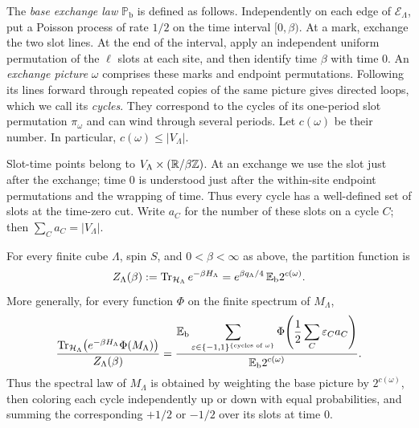 The \emph{base exchange law} $\mathbb P_{\mathrm b}$ is defined as
follows.  Independently on each edge of $\mathcal E_\Lambda$, put a
Poisson process of rate $1/2$ on the time interval $[0,\beta)$.
At a mark, exchange the two slot lines.  At the end of the interval,
apply an independent uniform permutation of the $\ell$ slots at each
site, and then identify time $\beta$ with time $0$.
An \emph{exchange picture} $\omega$ comprises these marks and endpoint
permutations.  Following its lines forward through repeated copies of
the same picture gives directed loops, which we call its \emph{cycles}.
They correspond to the cycles of its one-period slot permutation
$\pi_\omega$ and can wind through several periods.  Let
$c(\omega)$ be their number.  In particular,
$c(\omega)\le |V_\Lambda|$.

Slot-time points belong to
$V_\Lambda\times(\mathbb R/\beta\mathbb Z)$.  At an exchange we use the slot just
after the exchange; time $0$ is understood just after the within-site
endpoint permutations and the wrapping of time.  Thus every cycle has
a well-defined set of slots at the time-zero cut.  Write $a_C$ for the
number of these slots on a cycle $C$; then $\sum_C a_C=|V_\Lambda|$.

\begin{proposition}\label{prop:spin-loops}
For every finite cube $\Lambda$, spin $S$, and $0<\beta<\infty$ as
above, the partition function is
\begin{equation}\label{eq:loop-partition-function}
 Z_\Lambda(\beta):=\operatorname{Tr}_{\mathcal H_\Lambda}e^{-\beta H_\Lambda}
       =e^{\beta q_\Lambda/4}\,
                     \mathbb E_{\mathrm b}2^{c(\omega)}.
\end{equation}
More generally, for every function $\Phi$ on the finite spectrum of
$M_\Lambda$,
\begin{equation}\label{eq:spectral-loop-law}
 \frac{\operatorname{Tr}_{\mathcal H_\Lambda}
          \bigl(e^{-\beta H_\Lambda}\Phi(M_\Lambda)\bigr)}
      {Z_\Lambda(\beta)}
 =\frac{\displaystyle\mathbb E_{\mathrm b}
          \sum_{\varepsilon\in\{-1,1\}^{\{\text{cycles of }\omega\}}}
          \Phi\!\left(\frac12\sum_C\varepsilon_C a_C\right)}
        {\displaystyle\mathbb E_{\mathrm b}2^{c(\omega)}}.
\end{equation}
Thus the spectral law of $M_\Lambda$ is obtained by weighting the base
picture by $2^{c(\omega)}$, then coloring each cycle independently
up or down with equal probabilities, and summing the corresponding
$+1/2$ or $-1/2$ over its slots at time $0$.
\end{proposition}

